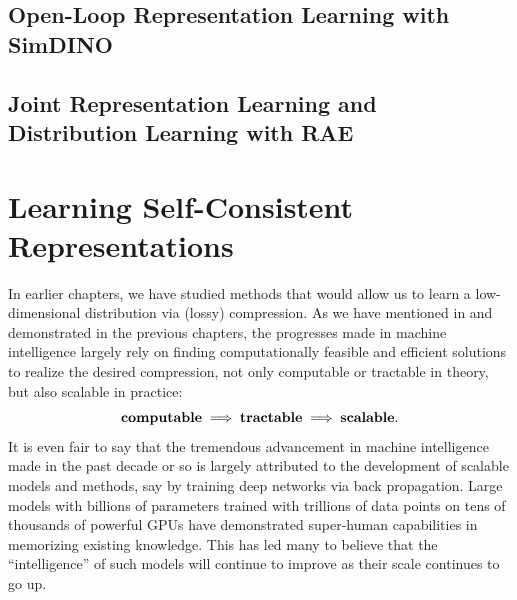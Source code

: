 \documentclass[../../book-main.tex]{subfiles}
\begin{document}
\subsection{Open-Loop Representation Learning with SimDINO}




\subsection{Joint Representation Learning and Distribution Learning with RAE}



\section{Learning Self-Consistent Representations}
\label{sec:self-consistency}


In earlier chapters, we have studied methods that would allow us to learn a low-dimensional distribution via (lossy) compression. As we have mentioned in  and demonstrated in the previous chapters, the progresses made in machine intelligence largely rely on finding computationally feasible and efficient solutions to realize the desired compression, not only computable or tractable in theory, but also scalable in practice:
\begin{equation}
\mbox{\textbf{computable}} \;
   \Longrightarrow \; \mbox{\textbf{tractable}} \; \Longrightarrow \; 
   \mbox{\textbf{scalable}}.
\end{equation}
It is even fair to say that the tremendous advancement in machine intelligence made in the past decade or so is largely attributed to the development of scalable models and methods, say by training deep networks via back propagation. Large models with billions of parameters trained with trillions of data points on tens of thousands of powerful GPUs have demonstrated super-human capabilities in memorizing existing knowledge. This has led many to believe that the ``intelligence'' of such models will continue to improve as their scale continues to go up. 
\end{document}
